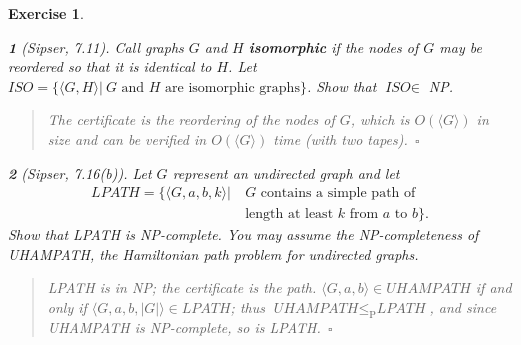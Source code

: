 \documentclass{article}
\theoremstyle{break}			%
\newtheorem{exercise}{Exercise}
\theoremstyle{plain}
\newtheorem{subexercise}{}[exercise]
\newenvironment{answer}{\begin{quotation}\noindent}{\end{quotation}}
\newcommand{\sipser}{\textit{Sipser}}
\newcommand{\encoding}[1]{\ensuremath{\langle#1\rangle}}
\renewcommand{\qed}{~\ensuremath{\square}}
\newcommand{\defin}[1]{\textbf{\textit{#1}}}
\newcommand{\setname}[1]{\textit{#1}}
\begin{document}
\begin{exercise}
\begin{subexercise}[\sipser, 7.11]
Call graphs $G$ and $H$ \defin{isomorphic} if the nodes of $G$ may be
reordered so that it is identical to $H$.  Let
$\setname{ISO}=\{\encoding{G,H}|~\text{$G$ and $H$ are isomorphic
graphs}\}$.  Show that $\setname{ISO}\in$ NP.
\end{subexercise}
\begin{answer}
The certificate is the reordering of the nodes of $G$, which is
$O(\encoding{G})$ in size and can be verified in $O(\encoding{G})$
time (with two tapes).\qed
\end{answer}

\begin{subexercise}[\sipser, 7.16(b)]
Let $G$ represent an undirected graph and let
\begin{align*}
\setname{LPATH} = \{\encoding{G,a,b,k}
|~&G \text{ contains a simple path of}\\
&\text{length at least $k$ from $a$ to $b$}\}.
\end{align*}
Show that \setname{LPATH} is NP-complete.  You may assume the
NP-completeness of \setname{UHAMPATH}, the Hamiltonian path problem
for undirected graphs.
\end{subexercise}
\begin{answer}
\setname{LPATH} is in NP; the certificate is the path.  
$\encoding{G,a,b}\in\setname{UHAMPATH}$ if and only if
$\encoding{G,a,b,|G|}\in\setname{LPATH}$; thus
$\setname{UHAMPATH}\leq_{\text{P}}\setname{LPATH}$, and since
\setname{UHAMPATH} is NP-complete, so is \setname{LPATH}.\qed
\end{answer}
\end{exercise}
\end{document}
